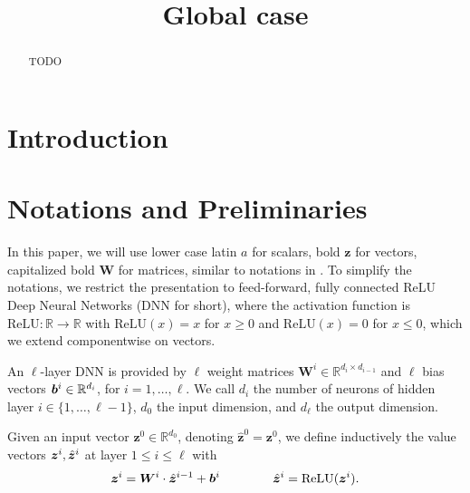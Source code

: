 \documentclass{llncs}
\title{Global case}
\date{}
\newcommand{\ReLU}{\mathrm{ReLU}}
\begin{document}
	
	\maketitle
	\linenumbers
	\begin{abstract}
		TODO
	\end{abstract}
	
	\section{Introduction}
	
	\section{Notations and Preliminaries}
	
	In this paper, we will use lower case latin $a$ for scalars, bold $\boldsymbol{z}$ for vectors, 
	capitalized bold $\boldsymbol{W}$ for matrices, similar to notations in \cite{crown}.
	To simplify the notations, we restrict the presentation to feed-forward, 
	fully connected ReLU Deep Neural Networks (DNN for short), where the activation function is $\ReLU : \mathbb{R} \rightarrow \mathbb{R}$ with
	$\ReLU(x)=x$ for $x \geq 0$ and $\ReLU(x)=0$ for $x \leq 0$, which we extend componentwise on vectors.
	
	
	
	
	An $\ell$-layer DNN is provided by $\ell$ weight matrices 
	$\boldsymbol{W}^i \in \mathbb{R}^{d_i\times d_{i-1}}$
	and $\ell$ bias vectors ${\bm{b}}^i \in \mathbb{R}^{d_i}$, for $i=1, \ldots, \ell$.
	We call $d_i$ the number of neurons of hidden layer $i \in \{1, \ldots, \ell-1\}$,
	$d_0$ the input dimension, and $d_\ell$ the output dimension.
	
	Given an input vector $\boldsymbol{z}^0 \in \mathbb{R}^{d_0}$, 
	denoting $\hat{\boldsymbol{z}}^{0}={\boldsymbol{z}}^0$, we define inductively the value vectors $\boldsymbol{z}^i,\hat{{\bm{z}}}^i$ at layer $1 \leq i \leq \ell$ with
	\begin{align*}
		\boldsymbol{z}^{i} = \boldsymbol{W}^i\cdot \hat{\boldsymbol{z}}^{i-1}+ \vb^i \qquad \, \qquad
		\hat{\boldsymbol{z}}^{i} = \ReLU({\boldsymbol{z}}^i).
	\end{align*} 
	
\end{document}

